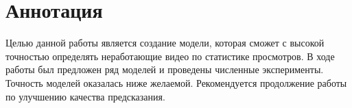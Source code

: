 
\chapter{Аннотация}

Целью данной работы является создание модели, которая сможет с высокой точностью определять неработающие видео по статистике просмотров. В ходе работы был предложен ряд моделей и проведены численные эксперименты. Точность моделей оказалась ниже желаемой. Рекомендуется продолжение работы по улучшению качества предсказания.